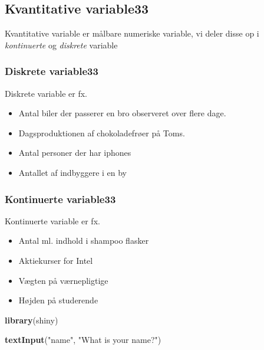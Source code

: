 \documentclass[]{book}
\newenvironment{Shaded}{\begin{snugshade}}{\end{snugshade}}
\newcommand{\KeywordTok}[1]{\textcolor[rgb]{0.13,0.29,0.53}{\textbf{#1}}}
\newcommand{\NormalTok}[1]{#1}
\newcommand{\StringTok}[1]{\textcolor[rgb]{0.31,0.60,0.02}{#1}}
\providecommand{\tightlist}{%
  \setlength{\itemsep}{0pt}\setlength{\parskip}{0pt}}
\theoremstyle{definition}
\theoremstyle{definition}
\theoremstyle{definition}
\theoremstyle{remark}
\begin{document}
\hypertarget{kvantitative-variable33}{%
\subsection{Kvantitative variable33}\label{kvantitative-variable33}}

Kvantitative variable er målbare numeriske variable, vi deler disse op i
\emph{kontinuerte} og \emph{diskrete} variable

\hypertarget{diskrete-variable33}{%
\subsubsection{Diskrete variable33}\label{diskrete-variable33}}

Diskrete variable er fx.

\begin{itemize}
\tightlist
\item
  Antal biler der passerer en bro observeret over flere dage.
\item
  Dagsproduktionen af chokoladefrøer på Toms. 
\item
  Antal personer der har iphones
\item
  Antallet af indbyggere i en by
\end{itemize}

\hypertarget{kontinuerte-variable33}{%
\subsubsection{Kontinuerte variable33}\label{kontinuerte-variable33}}

Kontinuerte variable er fx.

\begin{itemize}
\tightlist
\item
  Antal ml. indhold i shampoo flasker
\item
  Aktiekurser for Intel
\item
  Vægten på værnepligtige
\item
  Højden på studerende
\end{itemize}

\begin{Shaded}
\begin{Highlighting}[]
\KeywordTok{library}\NormalTok{(shiny)}

\KeywordTok{textInput}\NormalTok{(}\StringTok{"name"}\NormalTok{, }\StringTok{"What is your name?"}\NormalTok{)}
\end{Highlighting}
\end{Shaded}
\end{document}

